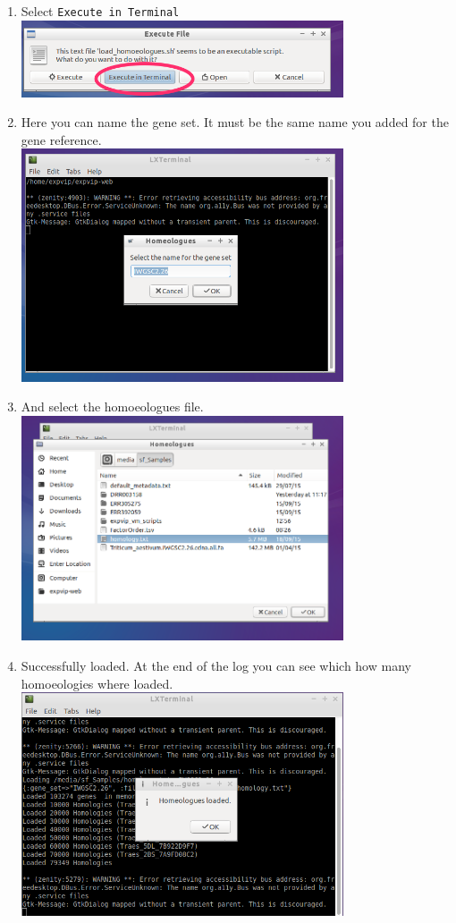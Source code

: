 \begin{enumerate}
\item
  Select \lstinline!Execute in Terminal!
  \\ \includegraphics[width=0.75\textwidth]{expVIP/tutorial/images/LoadHom02.png}
\item
  Here you can name the gene set. It must be the same name you added for
  the gene reference. \\ \includegraphics[width=0.75\textwidth]{expVIP/tutorial/images/LoadHom03.png}
\item
  And select the homoeologues file.
  \\ \includegraphics[width=0.75\textwidth]{expVIP/tutorial/images/LoadHom04.png}
\item
  Successfully loaded. At the end of the log you can see which how many
  homoeologies where loaded. \\ \includegraphics[width=0.75\textwidth]{expVIP/tutorial/images/LoadHom05.png}
\end{enumerate}


